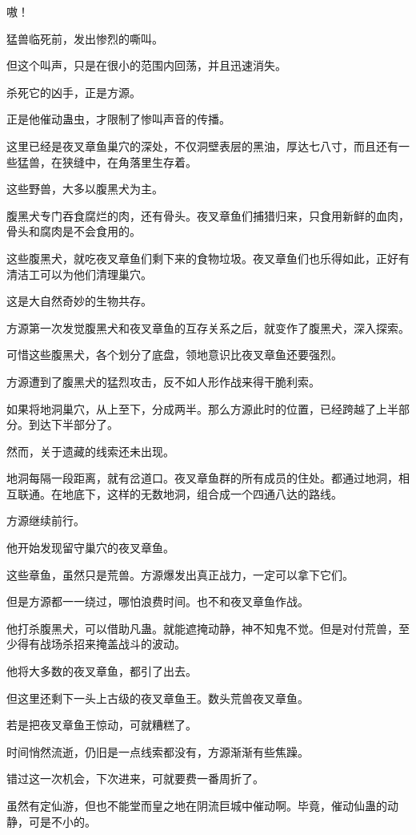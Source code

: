 \begin{this_body}
嗷！

猛兽临死前，发出惨烈的嘶叫。

但这个叫声，只是在很小的范围内回荡，并且迅速消失。

杀死它的凶手，正是方源。

正是他催动蛊虫，才限制了惨叫声音的传播。

这里已经是夜叉章鱼巢穴的深处，不仅洞壁表层的黑油，厚达七八寸，而且还有一些猛兽，在狭缝中，在角落里生存着。

这些野兽，大多以腹黑犬为主。

腹黑犬专门吞食腐烂的肉，还有骨头。夜叉章鱼们捕猎归来，只食用新鲜的血肉，骨头和腐肉是不会食用的。

这些腹黑犬，就吃夜叉章鱼们剩下来的食物垃圾。夜叉章鱼们也乐得如此，正好有清洁工可以为他们清理巢穴。

这是大自然奇妙的生物共存。

方源第一次发觉腹黑犬和夜叉章鱼的互存关系之后，就变作了腹黑犬，深入探索。

可惜这些腹黑犬，各个划分了底盘，领地意识比夜叉章鱼还要强烈。

方源遭到了腹黑犬的猛烈攻击，反不如人形作战来得干脆利索。

如果将地洞巢穴，从上至下，分成两半。那么方源此时的位置，已经跨越了上半部分。到达下半部分了。

然而，关于遗藏的线索还未出现。

地洞每隔一段距离，就有岔道口。夜叉章鱼群的所有成员的住处。都通过地洞，相互联通。在地底下，这样的无数地洞，组合成一个四通八达的路线。

方源继续前行。

他开始发现留守巢穴的夜叉章鱼。

这些章鱼，虽然只是荒兽。方源爆发出真正战力，一定可以拿下它们。

但是方源都一一绕过，哪怕浪费时间。也不和夜叉章鱼作战。

他打杀腹黑犬，可以借助凡蛊。就能遮掩动静，神不知鬼不觉。但是对付荒兽，至少得有战场杀招来掩盖战斗的波动。

他将大多数的夜叉章鱼，都引了出去。

但这里还剩下一头上古级的夜叉章鱼王。数头荒兽夜叉章鱼。

若是把夜叉章鱼王惊动，可就糟糕了。

时间悄然流逝，仍旧是一点线索都没有，方源渐渐有些焦躁。

错过这一次机会，下次进来，可就要费一番周折了。

虽然有定仙游，但也不能堂而皇之地在阴流巨城中催动啊。毕竟，催动仙蛊的动静，可是不小的。


\end{this_body}
